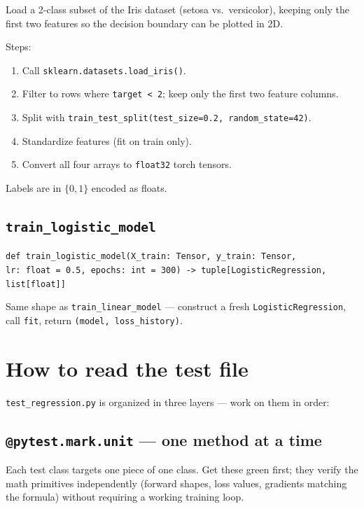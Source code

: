 \documentclass[11pt]{article}
\newcommand{\code}[1]{\texttt{\small #1}}
\begin{document}
\medskip\noindent
Load a 2-class subset of the Iris dataset (setosa vs.\ versicolor), keeping
only the first two features so the decision boundary can be plotted in 2D.

\medskip\noindent
Steps:
\begin{enumerate}
    \item Call \code{sklearn.datasets.load\_iris()}.
    \item Filter to rows where \code{target < 2}; keep only the first two
          feature columns.
    \item Split with \code{train\_test\_split(test\_size=0.2, random\_state=42)}.
    \item Standardize features (fit on train only).
    \item Convert all four arrays to \code{float32} torch tensors.
\end{enumerate}

\noindent
Labels are in $\{0, 1\}$ encoded as floats.

\subsection{\texttt{train\_logistic\_model}}

\noindent
\code{def train\_logistic\_model(X\_train: Tensor, y\_train: Tensor,\\
\hspace*{2em}lr: float = 0.5, epochs: int = 300) -> tuple[LogisticRegression, list[float]]}

\medskip\noindent
Same shape as \code{train\_linear\_model} --- construct a fresh
\code{LogisticRegression}, call \code{fit}, return \code{(model, loss\_history)}.

\section{How to read the test file}

\code{test\_regression.py} is organized in three layers --- work on them in order:

\subsection*{\texttt{@pytest.mark.unit} --- one method at a time}

Each test class targets one piece of one class. Get these green first; they
verify the math primitives independently (forward shapes, loss values,
gradients matching the formula) without requiring a working training loop.
\end{document}
